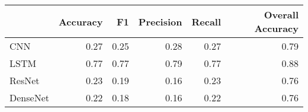 \begin{tabular}{lrrrrr}
\toprule
{} &  Accuracy &    F1 &  Precision &  Recall &  Overall Accuracy \\
\midrule
CNN      &      0.27 &  0.25 &       0.28 &    0.27 &              0.79 \\
LSTM     &      0.77 &  0.77 &       0.79 &    0.77 &              0.88 \\
ResNet   &      0.23 &  0.19 &       0.16 &    0.23 &              0.76 \\
DenseNet &      0.22 &  0.18 &       0.16 &    0.22 &              0.76 \\
\bottomrule
\end{tabular}
